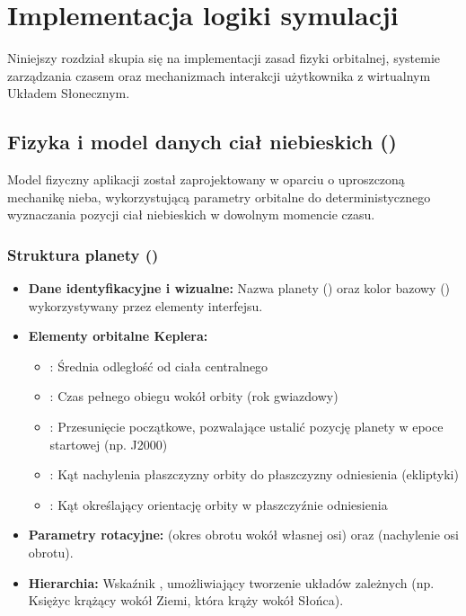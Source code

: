 \chapter{Implementacja logiki symulacji}
 Niniejszy rozdział skupia się na implementacji zasad fizyki orbitalnej, systemie zarządzania czasem oraz mechanizmach interakcji użytkownika z wirtualnym Układem Słonecznym.

    \section{Fizyka i model danych ciał niebieskich ()}
     Model fizyczny aplikacji został zaprojektowany w oparciu o uproszczoną mechanikę nieba, wykorzystującą parametry orbitalne do deterministycznego wyznaczania pozycji ciał niebieskich w dowolnym momencie czasu.

        \subsection{Struktura planety ()}

         \begin{itemize}
             \item[---] \textbf{Dane identyfikacyjne i wizualne:} Nazwa planety () oraz kolor bazowy () wykorzystywany przez elementy interfejsu.
             \item[---] \textbf{Elementy orbitalne Keplera:}
             \begin{itemize}
                 \item[---] : Średnia odległość od ciała centralnego
                 \item[---] : Czas pełnego obiegu wokół orbity (rok gwiazdowy)
                 \item[---] : Przesunięcie początkowe, pozwalające ustalić pozycję planety w epoce startowej (np. J2000)
                 \item[---] : Kąt nachylenia płaszczyzny orbity do płaszczyzny odniesienia (ekliptyki)
                 \item[---] : Kąt określający orientację orbity w płaszczyźnie odniesienia
             \end{itemize}
             \item[---] \textbf{Parametry rotacyjne:}  (okres obrotu wokół własnej osi) oraz  (nachylenie osi obrotu).
             \item[---] \textbf{Hierarchia:} Wskaźnik , umożliwiający tworzenie układów zależnych (np. Księżyc krążący wokół Ziemi, która krąży wokół Słońca).
         \end{itemize}

